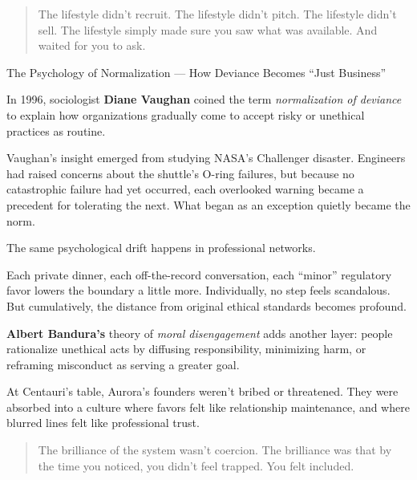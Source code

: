 \begin{quote}
The lifestyle didn’t recruit.  
The lifestyle didn’t pitch.  
The lifestyle didn’t sell.  
The lifestyle simply made sure you saw what was available.  
And waited for you to ask.
\end{quote}

\begin{PsychologicalSidebar}{The Psychology of Normalization --- How Deviance Becomes ``Just Business''}

  In 1996, sociologist \textbf{Diane Vaughan} coined the term \emph{normalization of deviance} to explain how 
  organizations gradually come to accept risky or unethical practices as routine.

  \medskip
  
  Vaughan’s insight emerged from studying NASA’s Challenger disaster. Engineers had raised concerns about the 
  shuttle’s O-ring failures, but because no catastrophic failure had yet occurred, each overlooked warning became 
  a precedent for tolerating the next. What began as an exception quietly became the norm.

  \medskip
  
  The same psychological drift happens in professional networks.

  \medskip
  
  Each private dinner, each off-the-record conversation, each “minor” regulatory favor lowers the boundary a little more. 
  Individually, no step feels scandalous. But cumulatively, the distance from original ethical standards becomes profound.

  \medskip
  
  \textbf{Albert Bandura’s} theory of \emph{moral disengagement} adds another layer: people rationalize unethical acts by 
  diffusing responsibility, minimizing harm, or reframing misconduct as serving a greater goal.

  \medskip
  
  At Centauri’s table, Aurora’s founders weren’t bribed or threatened. They were absorbed into 
  a culture where favors felt like relationship maintenance, and where blurred lines felt like professional trust.
  
  \begin{quote}
  The brilliance of the system wasn’t coercion.  The brilliance was that by the time you noticed, you didn’t feel trapped.  
  You felt included.
  \end{quote}
  
\end{PsychologicalSidebar}

